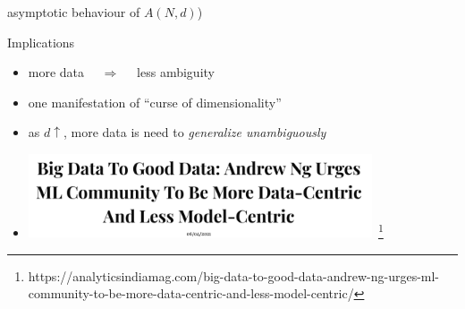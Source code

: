 \documentclass[aspectratio=169, 11pt, handout]{beamer}
\begin{document}
\begin{frame}{asymptotic behaviour of  $A(N, d)$)}
\end{frame}

\begin{frame}{Implications}
\begin{itemize}[<+->]
	\item more data $\quad\Rightarrow\quad$ less ambiguity
	\item one manifestation of ``curse of dimensionality''
        \item[] as $d \uparrow$, more data is need to \textit{generalize unambiguously}
	\item[] {
	\centering
	\bigskip
	\includegraphics[width=0.8\textwidth]{images/andrew-ng}~\footnote{https://analyticsindiamag.com/big-data-to-good-data-andrew-ng-urges-ml-community-to-be-more-data-centric-and-less-model-centric/}
	}
\end{itemize}
\end{frame}
\end{document}
